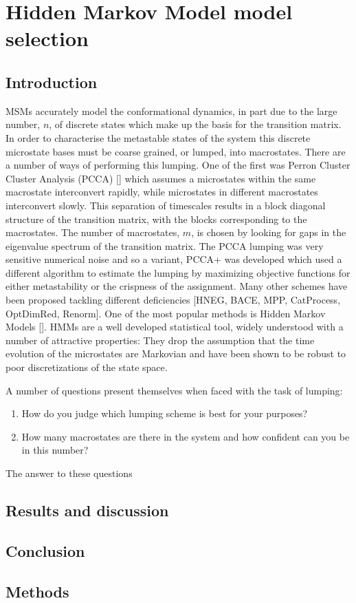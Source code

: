\let\textcircled=\pgftextcircled
\chapter{Hidden Markov Model model selection}
\label{chap:hmm}

\section{Introduction}
MSMs accurately model the conformational dynamics, in part due to the large number, $n$, of discrete states which make up the basis for the transition matrix. In order to characterise the metastable states of the system this discrete microstate bases must be coarse grained, or lumped, into macrostates. There are a number of ways of performing this lumping. One of the first was Perron Cluster Cluster Analysis (PCCA) [] which assumes a microstates within the same macrostate interconvert rapidly, while microstates in different macrostates interconvert slowly. This separation of timescales results in a block diagonal structure of the transition matrix, with the blocks corresponding to the macrostates. The number of macrostates, $m$, is chosen by looking for gaps in the eigenvalue spectrum of the transition matrix. The PCCA lumping was very sensitive numerical noise and so a variant, PCCA+ was developed which used a different algorithm to estimate the lumping by maximizing objective functions for either metastability or the crispness of the assignment. Many other schemes have been proposed tackling different deficiencies [HNEG, BACE, MPP, CatProcess, OptDimRed, Renorm]. One of the most popular methods is Hidden Markov Models []. HMMs are a well developed statistical tool, widely understood with a number of attractive properties: They drop the assumption that the time evolution of the microstates are Markovian and have been shown to be robust to poor discretizations of the state space. 

A number of questions present themselves when faced with the task of lumping: 
\begin{enumerate}
    \item How do you judge which lumping scheme is best for your purposes?
    \item How many macrostates are there in the system and how confident can you be in this number? 
\end{enumerate}

The answer to these questions 

\section{Results and discussion}

\section{Conclusion}

\section{Methods}

